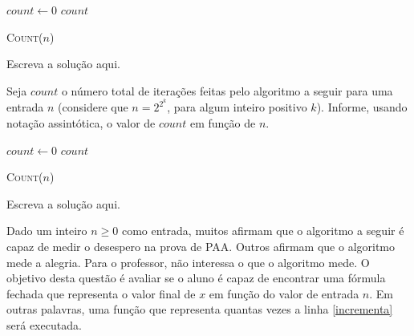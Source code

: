 \documentclass[a4paper]{exam}
\DeclarePairedDelimiter{\floor}{\lfloor}{\rfloor}
\begin{document}
\begin{questions}
  \begin{algorithm}[H]
    \NoCaptionOfAlgo
    \DontPrintSemicolon

    $count \gets 0$\;
    \Return $count$\;
    \caption{\textsc{Count}($n$)}
  \end{algorithm}
  \begin{solution}
    Escreva a solução aqui.
  \end{solution}
  \question Seja $count$ o número total de iterações feitas pelo
  algoritmo a seguir para uma entrada $n$ (considere que $n = 2^{2^{k}}$,
  para algum inteiro positivo $k$). Informe, usando
  notação assintótica, o valor de $count$ em função de $n$.
  
  \begin{algorithm}[H]
    \NoCaptionOfAlgo
    \DontPrintSemicolon

    $count \gets 0$\;
    \Return $count$\;
    \caption{\textsc{Count}($n$)}
  \end{algorithm}
  \begin{solution}
    Escreva a solução aqui.
  \end{solution}
  \question Dado um inteiro $n \geq 0$ como entrada, muitos
  afirmam que o algoritmo a seguir é capaz de medir o desespero na
  prova de PAA. Outros afirmam que o algoritmo mede a alegria. Para
  o professor, não interessa o que o algoritmo mede. O objetivo
  desta questão é avaliar se o aluno é capaz de encontrar uma
  fórmula fechada que representa o valor final de $x$ em função do
  valor de entrada $n$. Em outras palavras, uma função que
  representa quantas vezes a linha \ref{incrementa} será executada.

  \begin{algorithm}[H]
    \NoCaptionOfAlgo
    \DontPrintSemicolon


\end{algorithm}
\end{questions}
\end{document}
